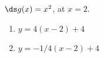 {$\ds g(x) = x^2$, at $x=2$.
}
{\begin{enumerate}
\item		$y = 4(x-2)+4$
\item		$y = -1/4(x-2)+4$
\end{enumerate}
}
